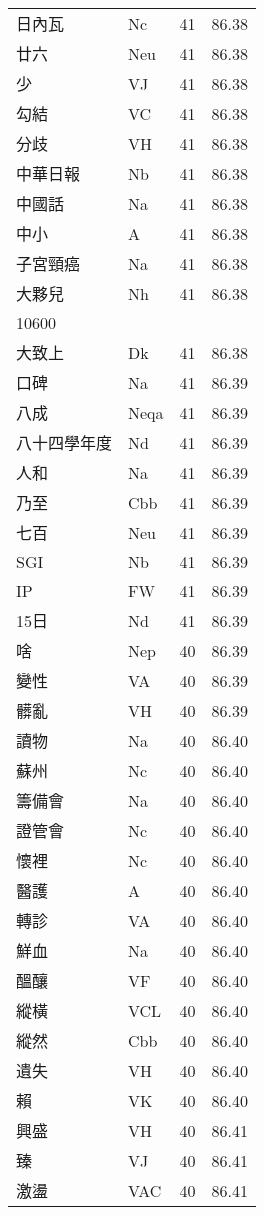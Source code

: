 \documentclass[twocolumn]{book}
\begin{document}
\begin{supertabular}{llrr}
日內瓦 & Nc & 41 &  86.38\\
廿六 & Neu & 41 &  86.38\\
少 & VJ & 41 &  86.38\\
勾結 & VC & 41 &  86.38\\
分歧 & VH & 41 &  86.38\\
中華日報 & Nb & 41 &  86.38\\
中國話 & Na & 41 &  86.38\\
中小 & A & 41 &  86.38\\
子宮頸癌 & Na & 41 &  86.38\\
大夥兒 & Nh & 41 &  86.38\\
10600\\
大致上 & Dk & 41 &  86.38\\
口碑 & Na & 41 &  86.39\\
八成 & Neqa & 41 &  86.39\\
八十四學年度 & Nd & 41 &  86.39\\
人和 & Na & 41 &  86.39\\
乃至 & Cbb & 41 &  86.39\\
七百 & Neu & 41 &  86.39\\
SGI & Nb & 41 &  86.39\\
IP & FW & 41 &  86.39\\
15日 & Nd & 41 &  86.39\\
啥 & Nep & 40 &  86.39\\
變性 & VA & 40 &  86.39\\
髒亂 & VH & 40 &  86.39\\
讀物 & Na & 40 &  86.40\\
蘇州 & Nc & 40 &  86.40\\
籌備會 & Na & 40 &  86.40\\
證管會 & Nc & 40 &  86.40\\
懷裡 & Nc & 40 &  86.40\\
醫護 & A & 40 &  86.40\\
轉診 & VA & 40 &  86.40\\
鮮血 & Na & 40 &  86.40\\
醞釀 & VF & 40 &  86.40\\
縱橫 & VCL & 40 &  86.40\\
縱然 & Cbb & 40 &  86.40\\
遺失 & VH & 40 &  86.40\\
賴 & VK & 40 &  86.40\\
興盛 & VH & 40 &  86.41\\
臻 & VJ & 40 &  86.41\\
激盪 & VAC & 40 &  86.41\\

\end{supertabular}
\end{document}

